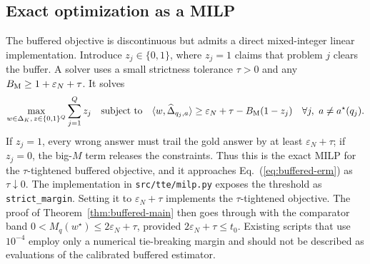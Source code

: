 \subsection{Exact optimization as a MILP}
\label{sec:method-milp}

The buffered objective is discontinuous but admits a direct mixed-integer
linear implementation.  Introduce \(z_j\in\{0,1\}\), where \(z_j=1\) claims
that problem \(j\) clears the buffer.  A solver uses a small strictness
tolerance \(\tau>0\) and any
\(B_{\rm M}\ge 1+\varepsilon_N+\tau\).  It solves
\begin{equation}
\max_{w\in\Delta_K,\,z\in\{0,1\}^Q}\sum_{j=1}^Qz_j
\quad\text{subject to}\quad
\langle w,\widehat\Delta_{q_j,a}\rangle
\ge
\varepsilon_N+\tau-B_{\rm M}(1-z_j)
\quad
\forall j,\ a\ne a^\star(q_j).
\label{eq:buffered-milp}
\end{equation}
If \(z_j=1\), every wrong answer must trail the gold answer by at least
\(\varepsilon_N+\tau\); if \(z_j=0\), the big-\(M\) term releases the
constraints.  Thus this is the exact MILP for the \(\tau\)-tightened buffered
objective, and it approaches Eq.~(\ref{eq:buffered-erm}) as
\(\tau\downarrow0\).
The implementation in \texttt{src/tte/milp.py} exposes the threshold as
\texttt{strict\_margin}.  Setting it to \(\varepsilon_N+\tau\) implements the
\(\tau\)-tightened objective.  The proof of Theorem~\ref{thm:buffered-main}
then goes through with the comparator band
\(0<M_q(w^\star)\le2\varepsilon_N+\tau\), provided
\(2\varepsilon_N+\tau\le t_0\).  Existing scripts that use \(10^{-4}\) employ
only a numerical tie-breaking margin and should not be described as evaluations
of the calibrated buffered estimator.
